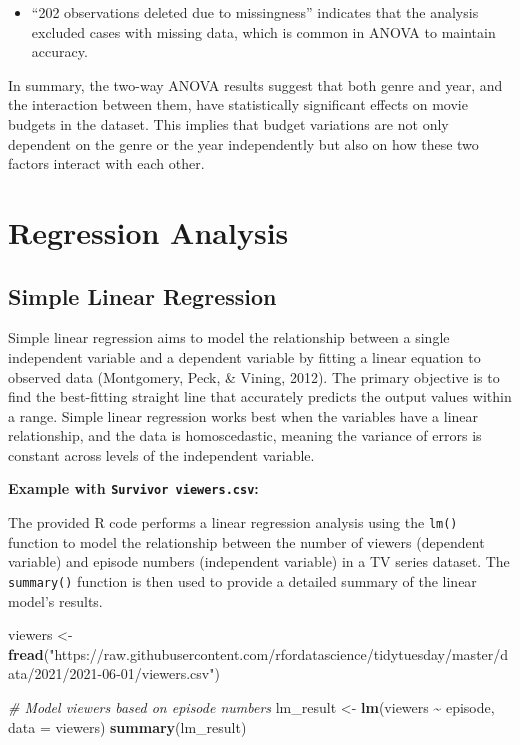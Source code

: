 \documentclass[
]{book}
\newenvironment{Shaded}{\begin{snugshade}}{\end{snugshade}}
\newcommand{\AttributeTok}[1]{\textcolor[rgb]{0.13,0.29,0.53}{#1}}
\newcommand{\CommentTok}[1]{\textcolor[rgb]{0.56,0.35,0.01}{\textit{#1}}}
\newcommand{\FunctionTok}[1]{\textcolor[rgb]{0.13,0.29,0.53}{\textbf{#1}}}
\newcommand{\NormalTok}[1]{#1}
\newcommand{\OtherTok}[1]{\textcolor[rgb]{0.56,0.35,0.01}{#1}}
\newcommand{\SpecialCharTok}[1]{\textcolor[rgb]{0.81,0.36,0.00}{\textbf{#1}}}
\newcommand{\StringTok}[1]{\textcolor[rgb]{0.31,0.60,0.02}{#1}}
\providecommand{\tightlist}{%
  \setlength{\itemsep}{0pt}\setlength{\parskip}{0pt}}
\begin{document}
\begin{enumerate}
  \begin{itemize}
  \tightlist
  \item
    ``202 observations deleted due to missingness'' indicates that the analysis excluded cases with missing data, which is common in ANOVA to maintain accuracy.
  \end{itemize}
\end{enumerate}

In summary, the two-way ANOVA results suggest that both genre and year, and the interaction between them, have statistically significant effects on movie budgets in the dataset. This implies that budget variations are not only dependent on the genre or the year independently but also on how these two factors interact with each other.

\section{Regression Analysis}\label{regression-analysis}

\subsection*{Simple Linear Regression}\label{simple-linear-regression}

Simple linear regression aims to model the relationship between a single independent variable and a dependent variable by fitting a linear equation to observed data (Montgomery, Peck, \& Vining, 2012). The primary objective is to find the best-fitting straight line that accurately predicts the output values within a range. Simple linear regression works best when the variables have a linear relationship, and the data is homoscedastic, meaning the variance of errors is constant across levels of the independent variable.

\textbf{Example with \texttt{Survivor\ viewers.csv}:}

The provided R code performs a linear regression analysis using the \texttt{lm()} function to model the relationship between the number of viewers (dependent variable) and episode numbers (independent variable) in a TV series dataset. The \texttt{summary()} function is then used to provide a detailed summary of the linear model's results.

\begin{Shaded}
\begin{Highlighting}[]
\NormalTok{viewers }\OtherTok{\textless{}{-}} \FunctionTok{fread}\NormalTok{(}\StringTok{"https://raw.githubusercontent.com/rfordatascience/tidytuesday/master/data/2021/2021{-}06{-}01/viewers.csv"}\NormalTok{)}

\CommentTok{\# Model viewers based on episode numbers}
\NormalTok{lm\_result }\OtherTok{\textless{}{-}} \FunctionTok{lm}\NormalTok{(viewers }\SpecialCharTok{\textasciitilde{}}\NormalTok{ episode, }\AttributeTok{data =}\NormalTok{ viewers)}
\FunctionTok{summary}\NormalTok{(lm\_result)}
\end{Highlighting}
\end{Shaded}
\end{document}

